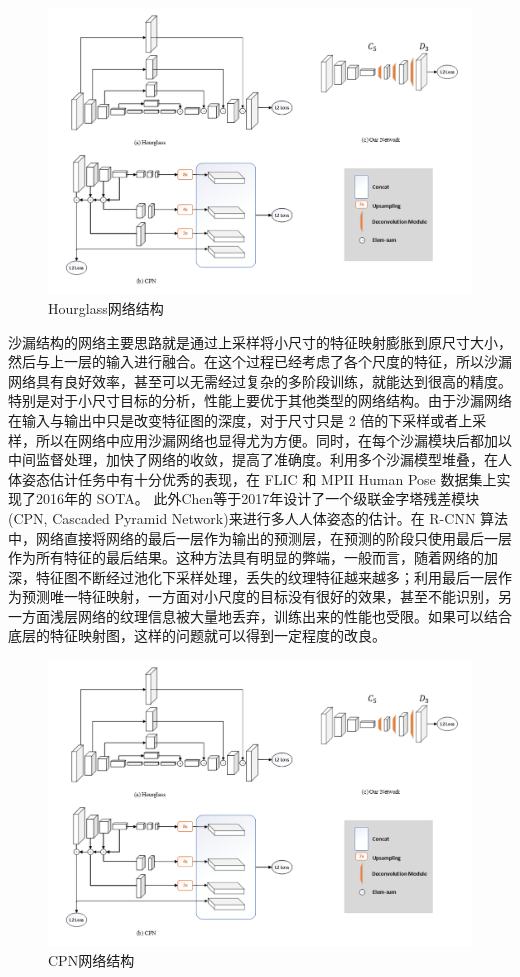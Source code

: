 \begin{figure}[h]
	\centering
	\includegraphics[scale=0.4]{figures/16.png}
	\caption{Hourglass网络结构}
	\label{fig:f16}
\end{figure}
沙漏结构的网络主要思路就是通过上采样将小尺寸的特征映射膨胀到原尺寸大小，然后与上一层的输入进行融合。在这个过程已经考虑了各个尺度的特征，所以沙漏网络具有良好效率，甚至可以无需经过复杂的多阶段训练，就能达到很高的精度。特别是对于小尺寸目标的分析，性能上要优于其他类型的网络结构。由于沙漏网络在输入与输出中只是改变特征图的深度，对于尺寸只是 2 倍的下采样或者上采样，所以在网络中应用沙漏网络也显得尤为方便。同时，在每个沙漏模块后都加以中间监督处理，加快了网络的收敛，提高了准确度。利用多个沙漏模型堆叠，在人体姿态估计任务中有十分优秀的表现，在 FLIC 和 MPII Human Pose 数据集上实现了2016年的 SOTA。
此外Chen等于2017年设计了一个级联金字塔残差模块(CPN, Cascaded  Pyramid Network)来进行多人人体姿态的估计。在 R-CNN 算法中，网络直接将网络的最后一层作为输出的预测层，在预测的阶段只使用最后一层作为所有特征的最后结果。这种方法具有明显的弊端，一般而言，随着网络的加深，特征图不断经过池化下采样处理，丢失的纹理特征越来越多；利用最后一层作为预测唯一特征映射，一方面对小尺度的目标没有很好的效果，甚至不能识别，另一方面浅层网络的纹理信息被大量地丢弃，训练出来的性能也受限。如果可以结合底层的特征映射图，这样的问题就可以得到一定程度的改良。
\begin{figure}[h]
	\centering
	\includegraphics[scale=0.4]{figures/17.png}
	\caption{CPN网络结构}
	\label{fig:f17}
\end{figure}

